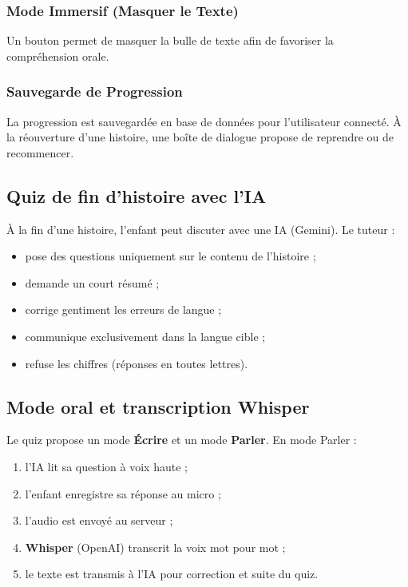 \documentclass[12pt,twoside,letterpaper]{article}
\begin{document}
\subsubsection{Mode Immersif (Masquer le Texte)}
Un bouton permet de masquer la bulle de texte afin de favoriser la compr\'ehension orale.

\subsubsection{Sauvegarde de Progression}
La progression est sauvegard\'ee en base de donn\'ees pour l'utilisateur connect\'e.
\`A la r\'eouverture d'une histoire, une bo\^ite de dialogue propose de reprendre ou de recommencer.

\subsection{Quiz de fin d'histoire avec l'IA}

\`A la fin d'une histoire, l'enfant peut discuter avec une IA (Gemini).
Le tuteur :
\begin{itemize}[leftmargin=*]
  \item pose des questions uniquement sur le contenu de l'histoire ;
  \item demande un court r\'esum\'e ;
  \item corrige gentiment les erreurs de langue ;
  \item communique exclusivement dans la langue cible ;
  \item refuse les chiffres (r\'eponses en toutes lettres).
\end{itemize}

\subsection{Mode oral et transcription Whisper}

Le quiz propose un mode \textbf{\'Ecrire} et un mode \textbf{Parler}.
En mode Parler :
\begin{enumerate}[leftmargin=*]
  \item l'IA lit sa question \`a voix haute ;
  \item l'enfant enregistre sa r\'eponse au micro ;
  \item l'audio est envoy\'e au serveur ;
  \item \textbf{Whisper} (OpenAI) transcrit la voix mot pour mot ;
  \item le texte est transmis \`a l'IA pour correction et suite du quiz.
\end{enumerate}
\end{document}
